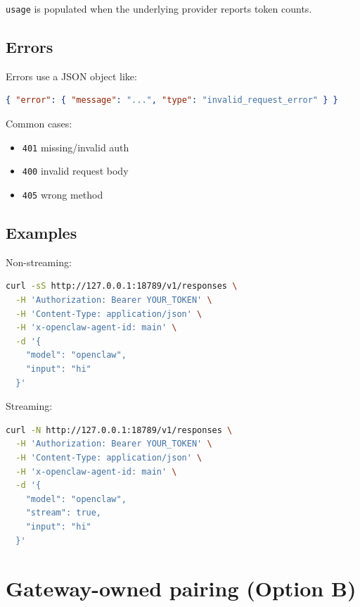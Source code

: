 \texttt{usage} is populated when the underlying provider reports token counts.

\subsection{Errors}


Errors use a JSON object like:

\begin{lstlisting}[language=json]
{ "error": { "message": "...", "type": "invalid_request_error" } }
\end{lstlisting}


Common cases:

\begin{itemize}
  \item \texttt{401} missing/invalid auth
  \item \texttt{400} invalid request body
  \item \texttt{405} wrong method
\end{itemize}


\subsection{Examples}


Non-streaming:

\begin{lstlisting}[language=bash]
curl -sS http://127.0.0.1:18789/v1/responses \
  -H 'Authorization: Bearer YOUR_TOKEN' \
  -H 'Content-Type: application/json' \
  -H 'x-openclaw-agent-id: main' \
  -d '{
    "model": "openclaw",
    "input": "hi"
  }'
\end{lstlisting}


Streaming:

\begin{lstlisting}[language=bash]
curl -N http://127.0.0.1:18789/v1/responses \
  -H 'Authorization: Bearer YOUR_TOKEN' \
  -H 'Content-Type: application/json' \
  -H 'x-openclaw-agent-id: main' \
  -d '{
    "model": "openclaw",
    "stream": true,
    "input": "hi"
  }'
\end{lstlisting}



\clearpage

\section{Gateway-owned pairing (Option B)}


